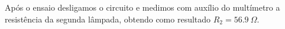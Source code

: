 \documentclass{report}
\begin{document}
Após o ensaio desligamos o circuito e medimos com auxílio do multímetro a resistência da segunda lâmpada, obtendo como resultado $R_2=56.9\ \Omega$.







\end{document}
